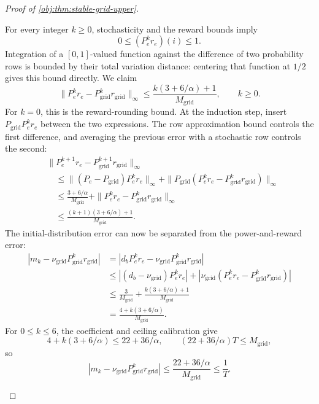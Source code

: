 \begin{proof}[Proof of \cref{obj:thm:stable-grid-upper}]
\begin{enumerate}
For every integer \(k\ge0\), stochasticity and the reward bounds imply
\[
0\le(P_e^kr_e)(i)\le1.
\]
Integration of a \([0,1]\)-valued function against the difference of two probability rows is bounded by their total variation distance: centering that function at \(1/2\) gives this bound directly. We claim
\[
\|P_e^kr_e-P_{\mathrm{grid}}^kr_{\mathrm{grid}}\|_\infty
\le
\frac{k(3+6/\alpha)+1}{M_{\mathrm{grid}}},
\qquad k\ge0.
\]
For \(k=0\), this is the reward-rounding bound. At the induction step, insert
\(P_{\mathrm{grid}}P_e^kr_e\) between the two expressions. The row approximation bound controls the first difference, and averaging the previous error with a stochastic row controls the second:
\[
\begin{aligned}
&\|P_e^{k+1}r_e-P_{\mathrm{grid}}^{k+1}r_{\mathrm{grid}}\|_\infty\\
&\quad\le
\|(P_e-P_{\mathrm{grid}})P_e^kr_e\|_\infty
+
\|P_{\mathrm{grid}}
 (P_e^kr_e-P_{\mathrm{grid}}^kr_{\mathrm{grid}})\|_\infty\\
&\quad\le
\frac{3+6/\alpha}{M_{\mathrm{grid}}}
+
\|P_e^kr_e-P_{\mathrm{grid}}^kr_{\mathrm{grid}}\|_\infty\\
&\quad\le
\frac{(k+1)(3+6/\alpha)+1}{M_{\mathrm{grid}}}.
\end{aligned}
\]
The initial-distribution error can now be separated from the power-and-reward error:
\[
\begin{aligned}
|m_k-\nu_{\mathrm{grid}}P_{\mathrm{grid}}^kr_{\mathrm{grid}}|
&=
|d_bP_e^kr_e-\nu_{\mathrm{grid}}P_{\mathrm{grid}}^kr_{\mathrm{grid}}|\\
&\le
|(d_b-\nu_{\mathrm{grid}})P_e^kr_e|
+
|\nu_{\mathrm{grid}}
 (P_e^kr_e-P_{\mathrm{grid}}^kr_{\mathrm{grid}})|\\
&\le
\frac3{M_{\mathrm{grid}}}
+
\frac{k(3+6/\alpha)+1}{M_{\mathrm{grid}}}\\
&=
\frac{4+k(3+6/\alpha)}{M_{\mathrm{grid}}}.
\end{aligned}
\]
For \(0\le k\le6\), the coefficient and ceiling calibration give
\[
4+k(3+6/\alpha)\le22+36/\alpha,
\qquad
(22+36/\alpha)T\le M_{\mathrm{grid}},
\]
so
\[
|m_k-\nu_{\mathrm{grid}}P_{\mathrm{grid}}^kr_{\mathrm{grid}}|
\le
\frac{22+36/\alpha}{M_{\mathrm{grid}}}
\le\frac1T.
\]


\end{enumerate}
\end{proof}

